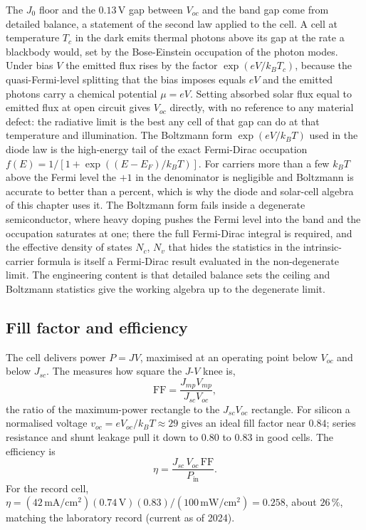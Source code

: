 \begin{mastery}
The $J_{0}$ floor and the $0.13\,\si{\volt}$ gap between $V_{oc}$ and
the band gap come from detailed balance, a statement of the second law
applied to the cell. A cell at temperature $T_{c}$ in the dark emits
thermal photons above its gap at the rate a blackbody would, set by the
Bose-Einstein occupation of the photon modes. Under bias $V$ the
emitted flux rises by the factor $\exp(eV/k_{B}T_{c})$, because the
quasi-Fermi-level splitting that the bias imposes equals $eV$ and the
emitted photons carry a chemical potential $\mu = eV$. Setting absorbed
solar flux equal to emitted flux at open circuit gives $V_{oc}$
directly, with no reference to any material defect: the radiative limit
is the best any cell of that gap can do at that temperature and
illumination. The Boltzmann form $\exp(eV/k_{B}T)$ used in the diode law
is the high-energy tail of the exact Fermi-Dirac occupation
$f(E) = 1/[1+\exp((E-E_{F})/k_{B}T)]$. For carriers more than a few
$k_{B}T$ above the Fermi level the $+1$ in the denominator is
negligible and Boltzmann is accurate to better than a percent, which is
why the diode and solar-cell algebra of this chapter uses it. The
Boltzmann form fails inside a degenerate semiconductor, where heavy
doping pushes the Fermi level into the band and the occupation
saturates at one; there the full Fermi-Dirac integral is required, and
the effective density of states $N_{c}$, $N_{v}$ that hides the
statistics in the intrinsic-carrier formula is itself a Fermi-Dirac
result evaluated in the non-degenerate limit. The engineering content
is that detailed balance sets the ceiling and Boltzmann statistics give
the working algebra up to the degenerate limit.
\end{mastery}

\subsection{Fill factor and efficiency}

The cell delivers power $P = JV$, maximised at an operating point below
$V_{oc}$ and below $J_{sc}$. The  measures how
square the $J$-$V$ knee is,
\[
\mathrm{FF} = \frac{J_{mp}V_{mp}}{J_{sc}V_{oc}},
\]
the ratio of the maximum-power rectangle to the $J_{sc}V_{oc}$
rectangle. For silicon a normalised voltage $v_{oc} = eV_{oc}/k_{B}T
\approx 29$ gives an ideal fill factor near $0.84$; series resistance
and shunt leakage pull it down to $0.80$ to $0.83$ in good cells. The
efficiency is
\[
\eta = \frac{J_{sc}\,V_{oc}\,\mathrm{FF}}{P_{\text{in}}}.
\]
For the record cell, $\eta = (42\,\si{\milli\ampere\per\centi\meter
\squared})(0.74\,\si{\volt})(0.83)/(100\,\si{\milli\watt\per\centi
\meter\squared}) = 0.258$, about $26\,\%$, matching the laboratory
record (current as of 2024).

